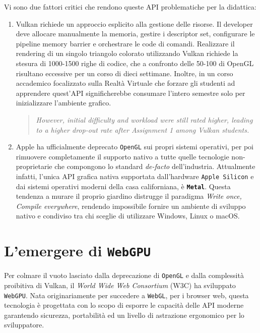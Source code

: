\documentclass[a4paper, 11pt, twoside]{report}
\begin{document}
Vi sono due fattori critici che rendono queste API problematiche per la didattica:
\begin{enumerate}
    \item \gls{Vulkan} richiede un approccio esplicito alla gestione delle risorse. Il developer deve allocare
        manualmente la memoria, gestire i descriptor set, configurare le pipeline memory barrier e orchestrare le code
        di comandi. Realizzare il rendering di un singolo triangolo colorato utilizzando \gls{Vulkan} richiede la
        stesura di 1000-1500 righe di codice, che a confronto delle 50-100 di OpenGL risultano eccessive per un corso di
        dieci settimane. Inoltre, in un corso accademico focalizzato sulla Realtà Virtuale che forzare gli studenti ad
        apprendere quest'API significherebbe consumare l'intero semestre solo per inizializzare l'ambiente grafico.
        \begin{quote}
        \itshape
        However, initial difficulty and workload were still rated higher, leading to a higher drop-out rate after
        Assignment 1 among Vulkan students. \cite{unterguggenberger2022road}
        \end{quote}
    \item Apple ha ufficialmente deprecato \texttt{OpenGL} sui propri sistemi operativi, per poi rimuovere completamente
        il supporto nativo a tutte quelle tecnologie non-proprietarie che compongono lo standard \textit{de-facto}
        dell'industria. Attualmente infatti, l'unica API grafica nativa supportata dall'hardware \texttt{Apple Silicon}
        e dai sistemi operativi moderni della casa californiana, è \textbf{\texttt{\gls{Metal}}}.
        Questa tendenza a murare il proprio giardino distrugge il paradigma \textit{Write once, Compile everywhere},
        rendendo impossibile fornire un ambiente di sviluppo nativo e condiviso tra chi sceglie di utilizzare Windows,
        Linux o macOS.
\end{enumerate}

\section{L'emergere di \texttt{WebGPU}}

Per colmare il vuoto lasciato dalla deprecazione di \texttt{OpenGL} e dalla complessità proibitiva di \gls{Vulkan},
il \textit{World Wide Web Consortium} (W3C) ha sviluppato \texttt{WebGPU}. Nata originariamente per succedere a
\texttt{WebGL}, per i browser web, questa tecnologia è progettata con lo scopo di esporre le capacità delle API moderne
garantendo sicurezza, portabilità ed un livello di astrazione ergonomico per lo sviluppatore.
\end{document}
